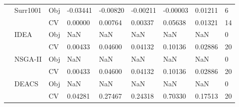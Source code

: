 \begin{table*}[!htb]
\begin{tabular}{lllllllll}
		& Surr1001                           & Obj                                & -0.03441                           & -0.00820                           & -0.00211                             & -0.00003                            & 0.01211                           & 6                \\
		&                                    & CV                                 & 0.00000                            & 0.00764                            & 0.00337                              & 0.05638                             & 0.01321                           & 14               \\
		& IDEA                               & Obj                                & NaN                                & NaN                                & NaN                                  & NaN                                 & NaN                               & 0                \\
		&                                    & CV                                 & 0.00433                            & 0.04600                            & 0.04132                              & 0.10136                             & 0.02886                           & 20               \\
		& NSGA-II                            & Obj                                & NaN                                & NaN                                & NaN                                  & NaN                                 & NaN                               & 0                \\
		&                                    & CV                                 & 0.00433                            & 0.04600                            & 0.04132                              & 0.10136                             & 0.02886                           & 20               \\
		& DEACS                              & Obj                                & NaN                                & NaN                                & NaN                                  & NaN                                 & NaN                               & 0                \\
		&                                    & CV                                 & 0.04281                            & 0.27467                            & 0.24318                              & 0.70330                             & 0.17513                           & 20               \\

\end{tabular}
\end{table*}
